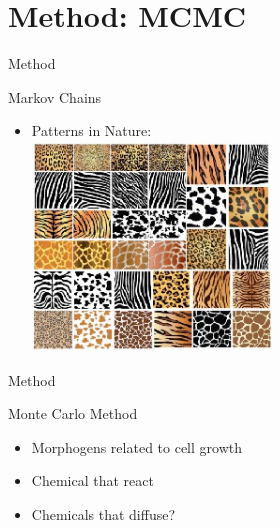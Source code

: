 \documentclass[t,10pt,fleqn]{beamer}
\begin{document}
\section{Method: MCMC}
\begin{frame}{Method}
\vspace{-.3cm}
\begin{block}{Markov Chains}
  \begin{itemize}
    \pause
    \item Patterns in Nature:
    \pause
    \\
    \includegraphics[width=0.5\textwidth]{creature_patterns2.png}
  \end{itemize}
\end{block}
\pause
\end{frame}

\begin{frame}{Method}
  \vspace{-.3cm}
  \begin{block}{Monte Carlo Method}
    \begin{itemize}
      \pause
      \item Morphogens related to cell growth
      \pause
      \item Chemical that react
      \pause
      \item Chemicals that diffuse?
      \pause
    \end{itemize}
 \end{block}
\pause
\end{frame}
\end{document}

